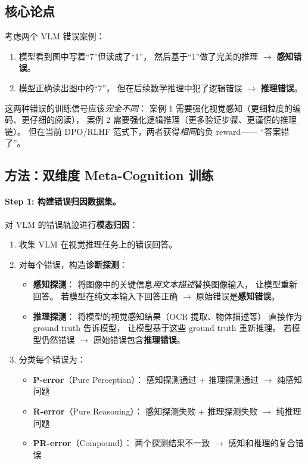 \documentclass[12pt,a4paper]{article}
\begin{document}
\subsection{核心论点}

\begin{insightbox}
考虑两个 VLM 错误案例：
\begin{enumerate}[leftmargin=2em]
  \item 模型看到图中写着``7''但读成了``1''，
    然后基于``1''做了完美的推理 $\rightarrow$ \textbf{感知错误}。
  \item 模型正确读出图中的``7''，
    但在后续数学推理中犯了逻辑错误 $\rightarrow$ \textbf{推理错误}。
\end{enumerate}
这两种错误的训练信号应该\textit{完全不同}：
案例 1 需要强化视觉感知（更细粒度的编码、更仔细的阅读），
案例 2 需要强化逻辑推理（更多验证步骤、更谨慎的推理链）。
但在当前 DPO/RLHF 范式下，两者获得\textit{相同}的负 reward——
``答案错了''。
\end{insightbox}

\subsection{方法：双维度 Meta-Cognition 训练}

\paragraph{Step 1: 构建错误归因数据集。}
对 VLM 的错误轨迹进行\textbf{模态归因}：

\begin{enumerate}[leftmargin=2em]
  \item 收集 VLM 在视觉推理任务上的错误回答。
  \item 对每个错误，构造\textbf{诊断探测}：
    \begin{itemize}
      \item \textbf{感知探测}：
        将图像中的关键信息\textit{用文本描述}替换图像输入，
        让模型重新回答。
        若模型在纯文本输入下回答正确 $\rightarrow$ 原始错误是\textbf{感知错误}。
      \item \textbf{推理探测}：
        将模型的视觉感知结果（OCR 提取、物体描述等）
        直接作为 ground truth 告诉模型，
        让模型基于这些 ground truth 重新推理。
        若模型仍然错误 $\rightarrow$ 原始错误包含\textbf{推理错误}。
    \end{itemize}
  \item 分类每个错误为：
    \begin{itemize}
      \item \textbf{P-error}（Pure Perception）：
        感知探测通过 + 推理探测通过 $\rightarrow$ 纯感知问题
      \item \textbf{R-error}（Pure Reasoning）：
        感知探测失败 + 推理探测失败 $\rightarrow$ 纯推理问题
      \item \textbf{PR-error}（Compound）：
        两个探测结果不一致 $\rightarrow$ 感知和推理的复合错误
    \end{itemize}
\end{enumerate}
\end{document}
